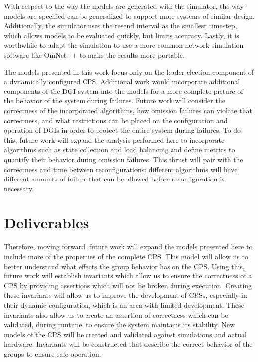 With respect to the way the models are generated with the simulator, the way models are specified can be generalized to support more systems of similar design.
Additionally, the simulator uses the resend interval as the smallest timestep, which allows models to be evaluated quickly, but limits accuracy.
Lastly, it is worthwhile to adapt the simulation to use a more common network simulation software like OmNet++\cite{OMNET} to make the results more portable.

The models presented in this work focus only on the leader election component of a dynamically configured CPS.
Additional work would incorporate additional components of the DGI system into the models for a more complete picture of the behavior of the system during failures.
Future work will consider the correctness of the incorporated algorithms, how omission failures can violate that correctness, and what restrictions can be placed on the configuration and operation of DGIs in order to protect the entire system during failures.
To do this, future work will expand the analysis performed here to incorporate algorithms such as state collection and load balancing and define metrics to quantify their behavior during omission failures.
This thrust will pair with the correctness and time between reconfigurations: different algorithms will have different amounts of failure that can be allowed before reconfiguration is necessary.

\section{Deliverables}

Therefore, moving forward, future work will expand the models presented here to include more of the properties of the complete CPS.
This model will allow us to better understand what effects the group behavior has on the CPS.
Using this, future work will establish invariants which allow us to ensure the correctness of a CPS by providing assertions which will not be broken during execution.
Creating these invariants will allow us to improve the development of CPSs, especially in their dynamic configuration, which is an area with limited development.
These invariants also allow us to create an assertion of correctness which can be validated, during runtime, to ensure the system maintains its stability.
New models of the CPS will be created and validated against simulations and actual hardware.
Invariants will be constructed that describe the correct behavior of the groups to ensure safe operation. 
